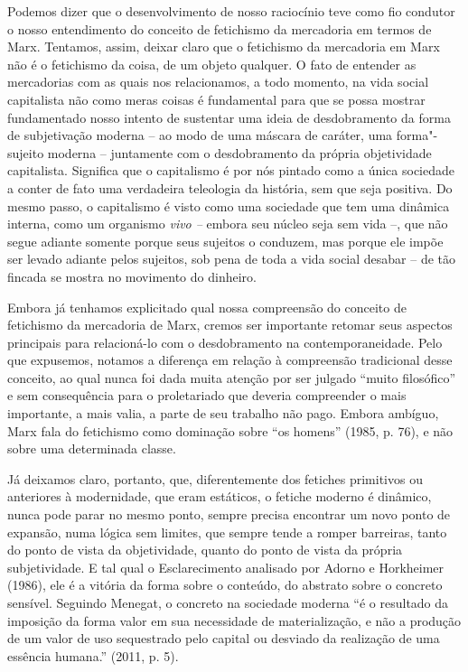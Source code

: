 Podemos dizer que o desenvolvimento de nosso raciocínio teve como fio
condutor o nosso entendimento do conceito de fetichismo da mercadoria em
termos de Marx. Tentamos, assim, deixar claro que o fetichismo da
mercadoria em Marx não é o fetichismo da coisa, de um objeto qualquer. O
fato de entender as mercadorias com as quais nos relacionamos, a todo
momento, na vida social capitalista não como meras coisas é fundamental
para que se possa mostrar fundamentado nosso intento de sustentar uma
ideia de desdobramento da forma de subjetivação moderna -- ao modo de
uma máscara de caráter, uma forma"-sujeito moderna -- juntamente com o
desdobramento da própria objetividade capitalista. Significa que o
capitalismo é por nós pintado como a única sociedade a conter de fato
uma verdadeira teleologia da história, sem que seja positiva. Do mesmo
passo, o capitalismo é visto como uma sociedade que tem uma dinâmica
interna, como um organismo \emph{vivo --} embora seu núcleo seja sem
vida --, que não segue adiante somente porque seus sujeitos o conduzem,
mas porque ele impõe ser levado adiante pelos sujeitos, sob pena de toda
a vida social desabar -- de tão fincada se mostra no movimento do
dinheiro.

Embora já tenhamos explicitado qual nossa compreensão do conceito de
fetichismo da mercadoria de Marx, cremos ser importante retomar seus
aspectos principais para relacioná-lo com o desdobramento na
contemporaneidade. Pelo que expusemos, notamos a diferença em relação à
compreensão tradicional desse conceito, ao qual nunca foi dada muita
atenção por ser julgado ``muito filosófico'' e sem consequência para o
proletariado que deveria compreender o mais importante, a mais valia, a
parte de seu trabalho não pago. Embora ambíguo, Marx fala do fetichismo
como dominação sobre ``os homens'' (1985, p. 76), e não sobre uma
determinada classe.

Já deixamos claro, portanto, que, diferentemente dos fetiches primitivos
ou anteriores à modernidade, que eram estáticos, o fetiche moderno é
dinâmico, nunca pode parar no mesmo ponto, sempre precisa encontrar um
novo ponto de expansão, numa lógica sem limites, que sempre tende a
romper barreiras, tanto do ponto de vista da objetividade, quanto do
ponto de vista da própria subjetividade. E tal qual o Esclarecimento
analisado por Adorno e Horkheimer (1986), ele é a vitória da forma sobre
o conteúdo, do abstrato sobre o concreto sensível. Seguindo Menegat, o
concreto na sociedade moderna ``é o resultado da imposição da forma
valor em sua necessidade de materialização, e não a produção de um valor
de uso sequestrado pelo capital ou desviado da realização de uma
essência humana.'' (2011, p. 5).


